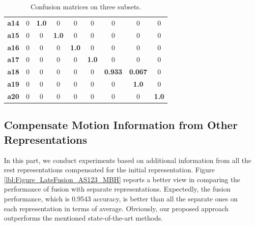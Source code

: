 \documentclass[review]{elsarticle}
\begin{document}
\begin{table}[H]
\begin{center}
{\begin{tabular}{c|cccccccc}
			     {\bf a14} &              0 &     {\bf 1.0 } &              0 &              0 &              0 &              0 &              0 &              0 \\
			
			     {\bf a15} &              0 &              0 &     {\bf 1.0 } &              0 &              0 &              0 &              0 &              0 \\
			
			     {\bf a16} &              0 &              0 &              0 &     {\bf 1.0 } &              0 &              0 &              0 &              0 \\
			
			     {\bf a17} &              0 &              0 &              0 &              0 &     {\bf 1.0 } &              0 &              0 &              0 \\
			
			     {\bf a18} &              0 &              0 &              0 &              0 &              0 &   {\bf 0.933 } &   {\bf 0.067 } &              0 \\
			
			     {\bf a19} &              0 &              0 &              0 &              0 &              0 &              0 &     {\bf 1.0 } &              0 \\
			
			     {\bf a20} &              0 &              0 &              0 &              0 &              0 &              0 &              0 &     {\bf 1.0 } \\
			
			\end{tabular}
		}
		
	\end{center}
	\caption{\label{lbl:AS123ConfusionMatrix}Confusion matrices on three subsets.}
\end{table}

\subsection{Compensate Motion Information from Other Representations}

In this part, we conduct experiments based on additional information from all the rest representations compensated for the initial representation. Figure \ref{lbl:Figure_LateFusion_AS123_MBH} reports a better view in comparing the performance of fusion with separate representations. Expectedly, the fusion performance, which is 0.9543 accuracy, is better than all the separate ones on each representation in terms of average. Obviously, our proposed approach outperforms the mentioned state-of-the-art methods.
 
\end{document}
